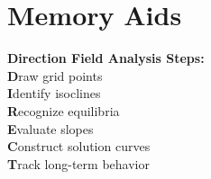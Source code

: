 \documentclass[12pt]{article}
\begin{document}
\section{Memory Aids}

\begin{center}
\textbf{Direction Field Analysis Steps:}\\
\textbf{D}raw grid points\\
\textbf{I}dentify isoclines\\
\textbf{R}ecognize equilibria\\
\textbf{E}valuate slopes\\
\textbf{C}onstruct solution curves\\
\textbf{T}rack long-term behavior
\end{center}
\end{document}
